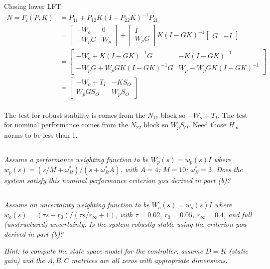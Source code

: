 \documentclass{article}
\begin{document}
Closing lower LFT:
\begin{align*}
    N = F_l(P,K) &= P_{11} + P_{12} K (I - P_{22} K)^{-1} P_{21} \\
    &= \begin{bmatrix} -W_o & 0 \\ -W_p G & W_p \end{bmatrix} + \begin{bmatrix} I \\ W_p G \end{bmatrix} K (I - G K)^{-1} \begin{bmatrix} G & -I \end{bmatrix} \\
    &= \begin{bmatrix} -W_o + K (I - G K)^{-1} G & -K (I - G K)^{-1} \\ -W_p G + W_p G K (I - G K)^{-1} G & W_p - W_p G K (I - G K)^{-1} \end{bmatrix} \\
    &= \begin{bmatrix} -W_o + T_I & -K S_O \\ W_p G S_O & W_p S_O \end{bmatrix} \\
\end{align*}

The test for robust stability is comes from the $N_{11}$ block so $-W_o + T_I$.
The test for nominal performance comes from the $N_{22}$ block so $W_p S_O$.
Need those $H_\infty$ norms to be less than 1.

\subsection{} 
\textit{Assume a performance weighting function to be $W_p(s) = w_p(s) I$ where $w_p(s) = (s / M + \omega_B^*)/(s + \omega_B^* A)$, with $A = 4$; $M = 10$; $\omega_B^* = 3$. Does the system satisfy this nominal performance criterion you derived in part (b)?}

\subsection{} 
\textit{Assume an uncertainty weighting function to be $W_o(s) = w_o(s) I$ where $w_o(s) = (\tau s + r_0)/(\tau s / r_{\infty} + 1)$, with $\tau = 0.02$, $r_0 = 0.05$, $r_{\infty} = 0.4$, and full (unstructured) uncertainty. Is the system robustly stable using the criterion you derived in part (b)?}

\textit{Hint: to compute the state space model for the controller, assume $D = K$ (static gain) and the $A, B, C$ matrices are all zeros with appropriate dimensions.}
\end{document}

